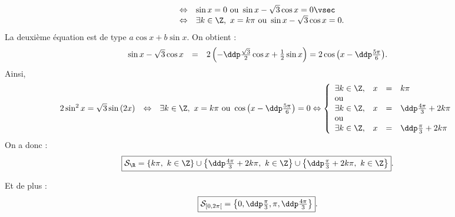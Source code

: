 \begin{correction}
\begin{enumerate}
$$\begin{array}{lll}
&\Leftrightarrow & \sin{x}=0\ \hbox{ou}\ \sin{x}-\sqrt{3}\cos{x}=0\vsec\\
&\Leftrightarrow & \exists k\in\Z,\  x=k\pi \ \hbox{ou}\ \sin{x}-\sqrt{3}\cos{x}=0.
\end{array}$$
La deuxi\`eme \'equation est de type $a\cos{x}+b\sin{x}$. On obtient :
$$\begin{array}{lll}
\sin{x}-\sqrt{3}\cos{x}&=&2\left( -\ddp\frac{\sqrt{3}}{2}\cos{x}+\frac{1}{2}\sin{x}   \right)
= 2\cos{\left(x-\ddp\frac{5\pi}{6}\right)}.
\end{array}$$
Ainsi,
$$\begin{array}{lll}
2\sin^2{x}=\sqrt{3}\sin{(2x)}& \Leftrightarrow& \exists k\in\Z,\  x=k\pi \ \hbox{ou}\ \cos{\left(x-\ddp\frac{5\pi}{6}\right)}=0
\Leftrightarrow \left\lbrace \begin{array}{llll}
\exists k\in\Z,&  x&=&k\pi\\
\hbox{ou}\\
\exists k\in\Z,&  x&=&\ddp\frac{4\pi}{3}+2k\pi\\
\hbox{ou}\\
\exists k\in\Z,& x&=&\ddp\frac{\pi}{3}+2k\pi\\
\end{array}\right.
\end{array}$$
On a donc :
$$\fbox{$\mathcal{S}_{\R}=\left\lbrace k\pi,\ k\in\Z  \right\rbrace\cup \left\lbrace \ddp\frac{4\pi}{3}+2k\pi,\ k\in\Z  \right\rbrace\cup \left\lbrace \ddp\frac{\pi}{3}+2k\pi,\ k\in\Z  \right\rbrace$}.$$
\begin{minipage}[c]{0.45\textwidth}
Et de plus :
$$\fbox{$\mathcal{S}_{\lbrack 0,2\pi\lbrack}=\left\lbrace 0,\ddp\frac{\pi}{3},\pi,\ddp\frac{4\pi}{3} \right\rbrace$}.$$
\end{minipage}
\quad \begin{minipage}[c]{0.45\textwidth}
\begin{center}

\end{center}
\end{minipage}
\end{enumerate}
\end{correction}
